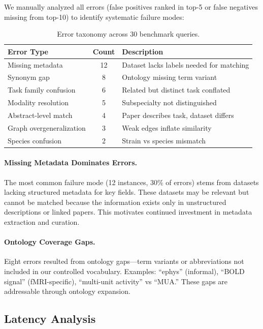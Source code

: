 \documentclass{article}
\theoremstyle{definition}
\begin{document}
We manually analyzed all errors (false positives ranked in top-5 or false negatives missing from top-10) to identify systematic failure modes:

\begin{table}[t]
\centering
\small
\caption{Error taxonomy across 30 benchmark queries.}
\label{tab:error-analysis}
\begin{tabular}{lcp{5cm}}
\toprule
\textbf{Error Type} & \textbf{Count} & \textbf{Description} \\
\midrule
Missing metadata & 12 & Dataset lacks labels needed for matching \\
Synonym gap & 8 & Ontology missing term variant \\
Task family confusion & 6 & Related but distinct task conflated \\
Modality resolution & 5 & Subspecialty not distinguished \\
Abstract-level match & 4 & Paper describes task, dataset differs \\
Graph overgeneralization & 3 & Weak edges inflate similarity \\
Species confusion & 2 & Strain vs species mismatch \\
\bottomrule
\end{tabular}
\end{table}

\paragraph{Missing Metadata Dominates Errors.} The most common failure mode (12 instances, 30\% of errors) stems from datasets lacking structured metadata for key fields. These datasets may be relevant but cannot be matched because the information exists only in unstructured descriptions or linked papers. This motivates continued investment in metadata extraction and curation.

\paragraph{Ontology Coverage Gaps.} Eight errors resulted from ontology gaps---term variants or abbreviations not included in our controlled vocabulary. Examples: ``ephys'' (informal), ``BOLD signal'' (fMRI-specific), ``multi-unit activity'' vs ``MUA.'' These gaps are addressable through ontology expansion.

\subsection{Latency Analysis}
\end{document}
